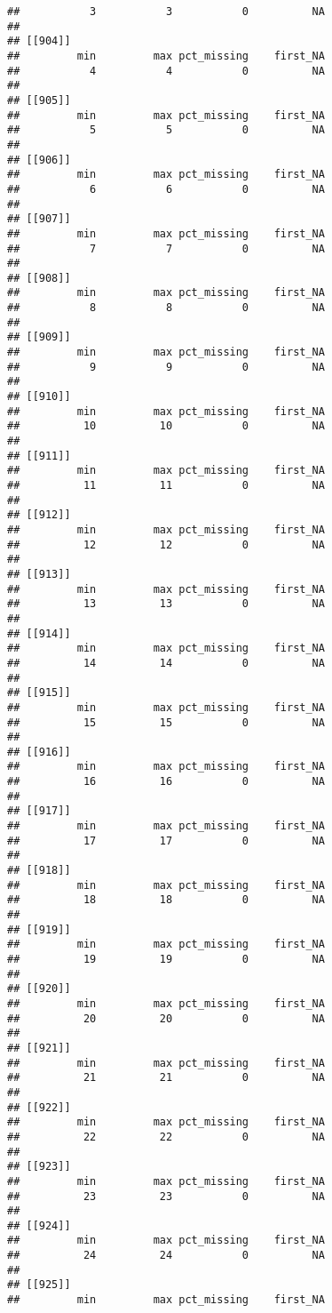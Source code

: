 \documentclass[
]{article}
\begin{document}
\begin{verbatim}
##           3           3           0          NA 
## 
## [[904]]
##         min         max pct_missing    first_NA 
##           4           4           0          NA 
## 
## [[905]]
##         min         max pct_missing    first_NA 
##           5           5           0          NA 
## 
## [[906]]
##         min         max pct_missing    first_NA 
##           6           6           0          NA 
## 
## [[907]]
##         min         max pct_missing    first_NA 
##           7           7           0          NA 
## 
## [[908]]
##         min         max pct_missing    first_NA 
##           8           8           0          NA 
## 
## [[909]]
##         min         max pct_missing    first_NA 
##           9           9           0          NA 
## 
## [[910]]
##         min         max pct_missing    first_NA 
##          10          10           0          NA 
## 
## [[911]]
##         min         max pct_missing    first_NA 
##          11          11           0          NA 
## 
## [[912]]
##         min         max pct_missing    first_NA 
##          12          12           0          NA 
## 
## [[913]]
##         min         max pct_missing    first_NA 
##          13          13           0          NA 
## 
## [[914]]
##         min         max pct_missing    first_NA 
##          14          14           0          NA 
## 
## [[915]]
##         min         max pct_missing    first_NA 
##          15          15           0          NA 
## 
## [[916]]
##         min         max pct_missing    first_NA 
##          16          16           0          NA 
## 
## [[917]]
##         min         max pct_missing    first_NA 
##          17          17           0          NA 
## 
## [[918]]
##         min         max pct_missing    first_NA 
##          18          18           0          NA 
## 
## [[919]]
##         min         max pct_missing    first_NA 
##          19          19           0          NA 
## 
## [[920]]
##         min         max pct_missing    first_NA 
##          20          20           0          NA 
## 
## [[921]]
##         min         max pct_missing    first_NA 
##          21          21           0          NA 
## 
## [[922]]
##         min         max pct_missing    first_NA 
##          22          22           0          NA 
## 
## [[923]]
##         min         max pct_missing    first_NA 
##          23          23           0          NA 
## 
## [[924]]
##         min         max pct_missing    first_NA 
##          24          24           0          NA 
## 
## [[925]]
##         min         max pct_missing    first_NA 

\end{verbatim}
\end{document}
